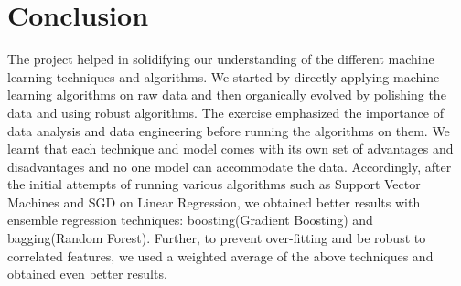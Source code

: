 \documentclass[12pt,a4paper]{article}
\begin{document}
\section{Conclusion}
The project helped in solidifying our understanding of the different machine learning techniques and algorithms. We started by directly applying machine learning algorithms on raw data and then organically evolved by polishing the data and using robust algorithms. The exercise emphasized the importance of data analysis and data engineering before running the algorithms on them. We learnt that each technique and model comes with its own set of advantages and disadvantages and no one model can accommodate the data. Accordingly, after the initial attempts of running various algorithms such as Support Vector Machines and SGD on Linear Regression, we obtained better results with ensemble regression techniques: boosting(Gradient Boosting) and bagging(Random Forest). Further, to prevent over-fitting and be robust to correlated features, we used a weighted average of the above techniques and obtained even better results.
\end{document}
